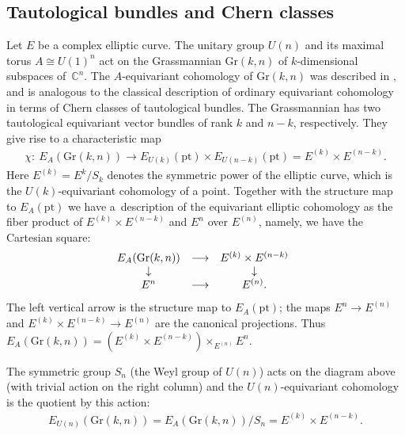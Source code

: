 \documentclass[pdftex]{sigma}
\numberwithin{equation}{section}
\begin{document}
\subsection{Tautological bundles and Chern classes}\label{ss-eecG}
Let $E$ be a complex elliptic curve. The unitary group $U(n)$ and its maximal torus $A\cong U(1)^n$ act on the Grassmannian $\mathrm{Gr}(k,n)$ of $k$-dimensional subspaces of~$\mathbb C^n$. The $A$-equivariant cohomo\-logy of $\mathrm{Gr}(k,n)$ was described in \cite[Section~1.9]{GKV}, and is analogous to the classical description of ordinary equivariant cohomology in terms of Chern classes of tautological bundles. The Grassmannian has two tautological equivariant vector bundles of rank $k$ and $n-k$, respectively. They give rise to a characteristic map~\cite{GKV}
\begin{gather*} \chi\colon \ E_A(\mathrm{Gr}(k,n))\to E_{U(k)}(\mathrm{pt})\times E_{U(n-k)}(\mathrm{pt})=E^{(k)}\times E^{(n-k)}.
\end{gather*} Here $E^{(k)}=E^k/S_k$ denotes the symmetric power of the elliptic curve, which is the $U(k)$-equivariant cohomology of a point. Together with the structure map to $E_A(\mathrm{pt})$ we have a~description of
the equivariant elliptic cohomology as the fiber product of $E^{(k)}\times E^{(n-k)}$ and $E^n$ over $E^{(n)}$, namely, we have the Cartesian square:
\begin{gather*}
 \begin{array}{@{}ccc}
 E_A(\mathrm{Gr}(k,n))&\longrightarrow&E^{(k)}\times E^{(n-k)}\\
 \downarrow& &\downarrow\\ E^n&\longrightarrow&E^{(n)}.
 \end{array}
\end{gather*}
The left vertical arrow is the structure map to $E_A(\mathrm{pt})$; the maps $E^n\to E^{(n)}$ and $E^{(k)}\times E^{(n-k)}\to E^{(n)} $ are the canonical projections. Thus $ E_A(\mathrm{Gr}(k,n))=(E^{(k)}\times
E^{(n-k)})\times_{E^{(n)}}E^n $.

The symmetric group $S_n$ (the Weyl group of $U(n)$) acts on the diagram above (with trivial action on the right column) and the $U(n)$-equivariant cohomology is the quotient by this action:
\begin{gather*}
 E_{U(n)}(\mathrm{Gr}(k,n))=E_A(\mathrm{Gr}(k,n))/S_n=E^{(k)}\times E^{(n-k)}.
\end{gather*}
\end{document}
